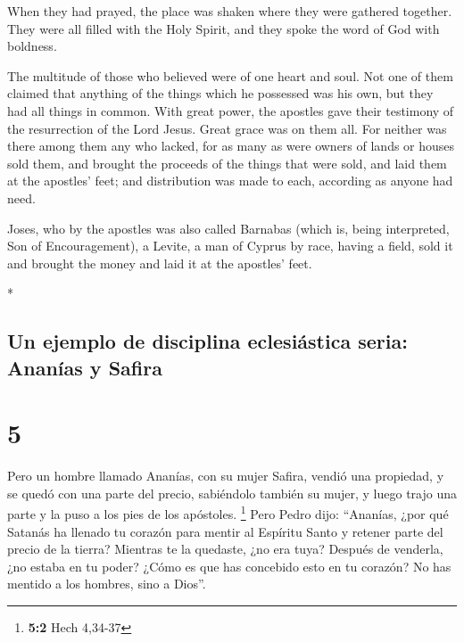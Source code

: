 \begin{paracol}{2}
\begin{otherlanguage}{english}
 When they had prayed, the place was shaken where they
were gathered together. They were all filled with the Holy Spirit, and
they spoke the word of God with boldness.

 The multitude of those who believed were of one heart
and soul. Not one of them claimed that anything of the things which he
possessed was his own, but they had all things in common.
 With great power, the apostles gave their testimony of
the resurrection of the Lord Jesus. Great grace was on them all.
 For neither was there among them any who lacked, for as
many as were owners of lands or houses sold them, and brought the
proceeds of the things that were sold,  and laid them at
the apostles' feet; and distribution was made to each, according as
anyone had need.

 Joses, who by the apostles was also called Barnabas
(which is, being interpreted, Son of Encouragement), a Levite, a man of
Cyprus by race,  having a field, sold it and brought the
money and laid it at the apostles' feet.

\end{otherlanguage}

\switchcolumn[0]*

\hypertarget{un-ejemplo-de-disciplina-eclesiuxe1stica-seria-ananuxedas-y-safira}{%
\subsection{Un ejemplo de disciplina eclesiástica seria: Ananías y
Safira}\label{un-ejemplo-de-disciplina-eclesiuxe1stica-seria-ananuxedas-y-safira}}

\hypertarget{section-8}{%
\section{5}\label{section-8}}

 Pero un hombre llamado Ananías, con su mujer Safira,
vendió una propiedad,  y se quedó con una parte del
precio, sabiéndolo también su mujer, y luego trajo una parte y la puso a
los pies de los apóstoles. \footnote{\textbf{5:2} Hech 4,34-37}
 Pero Pedro dijo: ``Ananías, ¿por qué Satanás ha llenado
tu corazón para mentir al Espíritu Santo y retener parte del precio de
la tierra?  Mientras te la quedaste, ¿no era tuya? Después
de venderla, ¿no estaba en tu poder? ¿Cómo es que has concebido esto en
tu corazón? No has mentido a los hombres, sino a Dios''.


\end{paracol}
